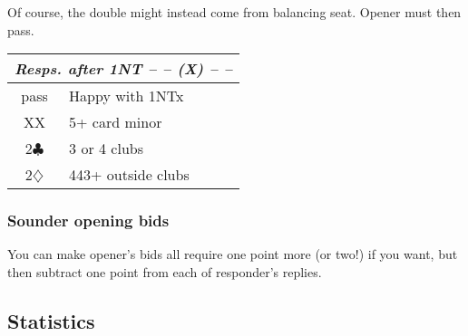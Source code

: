 \documentclass[a4paper, twoside, 11pt]{article}
\begin{document}
\begin{multicols}{3}
\begin{center}
\begin{tabular}{ |c|l| }
 \hline
\end{tabular}
\end{center}

Of course, the double might instead come from balancing seat. Opener must then pass.

\begin{center}
\begin{tabular}{ |c|l| }
 \hline
 \multicolumn{2}{|c|}{\textit{Resps. after 1NT -- -- (X) -- --}} \\
 \hline
 pass & Happy with 1NTx \\
 XX & 5+ card minor \\
 2$\clubsuit$ & 3 or 4 clubs \\
 2$\diamondsuit$ &  443+ outside clubs \\
 \hline
\end{tabular}
\end{center}


\subsubsection*{Sounder opening bids}
You can make opener's bids all require one point more (or two!) if you want, but then subtract one point from each of responder's replies.


\subsection*{Statistics}


\end{multicols}
\end{document}
